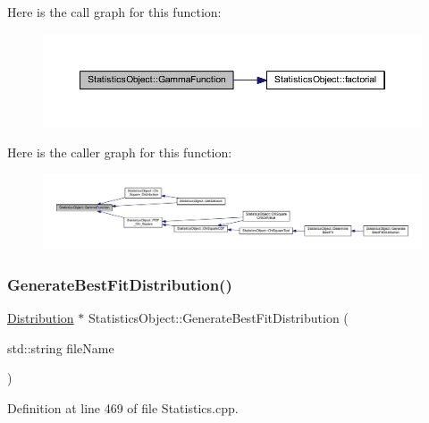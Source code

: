Here is the call graph for this function\+:
\nopagebreak
\begin{figure}[H]
\begin{center}
\leavevmode
\includegraphics[width=350pt]{class_statistics_object_a0d9dc9480288e61b3e98134deb18d2d4_cgraph}
\end{center}
\end{figure}
Here is the caller graph for this function\+:
\nopagebreak
\begin{figure}[H]
\begin{center}
\leavevmode
\includegraphics[width=350pt]{class_statistics_object_a0d9dc9480288e61b3e98134deb18d2d4_icgraph}
\end{center}
\end{figure}
\mbox{\label{class_statistics_object_a88d8c8b8fd57da4a08cf1d02d363abf1}} 
\subsubsection{\texorpdfstring{Generate\+Best\+Fit\+Distribution()}{GenerateBestFitDistribution()}}
{\footnotesize\ttfamily \hyperlink{class_distribution}{Distribution} $\ast$ Statistics\+Object\+::\+Generate\+Best\+Fit\+Distribution (\begin{DoxyParamCaption}\item[{std\+::string}]{file\+Name }\end{DoxyParamCaption})}



Definition at line 469 of file Statistics.\+cpp.

